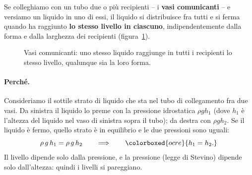 Se colleghiamo con un tubo due o più recipienti -- i \textbf{vasi comunicanti} -- e versiamo un liquido in uno di essi, il liquido si distribuisce fra tutti e si ferma quando ha raggiunto \textbf{lo stesso livello in ciascuno}, indipendentemente dalla forma e dalla larghezza dei recipienti (figura~\ref{fig:vasi}).

\begin{figure}[!htbp]
    \centering
    \caption{Vasi comunicanti: uno stesso liquido raggiunge in tutti i recipienti lo stesso livello, qualunque sia la loro forma.}
    \label{fig:vasi}
\end{figure}

\paragraph{Perché.} Consideriamo il sottile strato di liquido che sta nel tubo di collegamento fra due vasi. Da sinistra il liquido lo preme con la pressione idrostatica $\rho g h_1$ (dove $h_1$ è l'altezza del liquido nel vaso di sinistra sopra il tubo); da destra con $\rho g h_2$. Se il liquido è fermo, quello strato è in equilibrio e le due pressioni sono uguali:
\[ \rho\,g\,h_1 = \rho\,g\,h_2 \qquad\Longrightarrow\qquad \colorboxed{ocre}{ h_1 = h_2. } \]
Il livello dipende solo dalla pressione, e la pressione (legge di Stevino) dipende solo dall'altezza: quindi i livelli si pareggiano.


